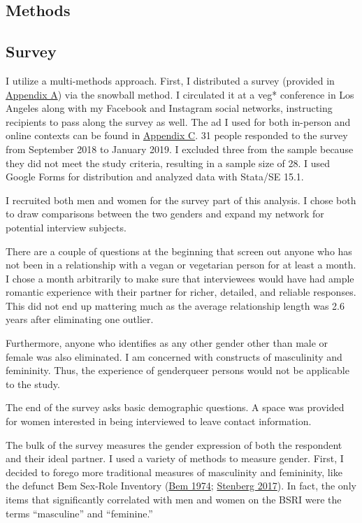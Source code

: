 \documentclass[twoside]{report}
\let\oldsection\section
\renewcommand\section{\clearpage\oldsection}
\begin{document}
\begin{multicols}{2}
\section{Methods}

\subsection{Survey}

I utilize a multi-methods approach. First, I distributed a survey
(provided in \hyperlink{appendix-a}{Appendix A}) via the snowball method. I circulated it at a
veg* conference in Los Angeles along with my Facebook and Instagram social networks, instructing recipients to pass along the survey as well. The ad I used for both in-person and online contexts can be found in \hyperlink{appendix-c}{Appendix C}. 31 people responded to the survey from September 2018 to January 2019. I excluded
three from the sample because they did not meet the study criteria,
resulting in a sample size of 28. I used Google Forms for distribution
and analyzed data with Stata/SE 15.1.

I recruited both men and women for the survey part of this analysis. I
chose both to draw comparisons between the two genders and expand my
network for potential interview subjects. 

There are a couple of questions at the beginning that screen out anyone who has not been in a relationship with a vegan or vegetarian person for at least a month. I chose a month arbitrarily to make sure that interviewees would have had ample romantic experience with their partner for richer, detailed, and reliable responses. This did not end up mattering much as the average relationship length was 2.6 years after eliminating one outlier. 

Furthermore, anyone who identifies as any other gender other than male or female was also eliminated. I am concerned with constructs of masculinity and femininity. Thus, the experience of genderqueer persons would not be applicable to the study. 

The end of the survey asks basic demographic questions. A space was provided for women interested in being interviewed to leave contact information.

The bulk of the survey measures the gender expression of both the
respondent and their ideal partner. I used a variety of methods to
measure gender. First, I decided to forego more traditional measures of
masculinity and femininity, like the defunct Bem Sex-Role Inventory (\hyperlink{bem}{Bem 1974}; \hyperlink{stenberg}{Stenberg 2017}). In fact, the only items that
significantly correlated with men and women on the BSRI were the terms
``masculine'' and ``feminine.''


\end{multicols}
\end{document}
